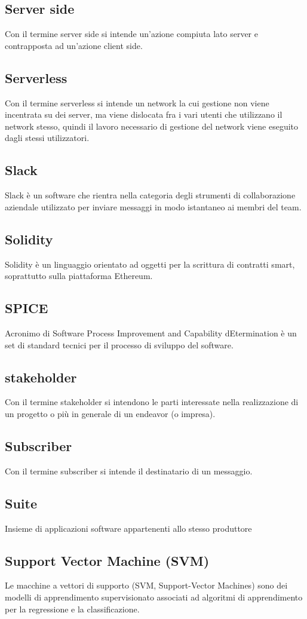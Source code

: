 \subsection{Server side }  Con il termine server side si intende un'azione compiuta lato server e contrapposta ad un'azione client side.
\subsection{Serverless}  Con il termine serverless si intende un network la cui gestione non viene incentrata su dei server, ma viene dislocata fra i vari utenti che utilizzano il network stesso, quindi il lavoro necessario di gestione del network viene eseguito dagli stessi utilizzatori.
\subsection{Slack}  Slack è un software che rientra nella categoria degli strumenti di collaborazione aziendale utilizzato per inviare messaggi in modo istantaneo ai membri del team.
\subsection{Solidity}  Solidity è un linguaggio orientato ad oggetti per la scrittura di contratti smart, soprattutto sulla piattaforma Ethereum.
\subsection{SPICE}  Acronimo di Software Process Improvement and Capability dEtermination è un set di standard tecnici per il processo di sviluppo del software.
\subsection{stakeholder}  Con il termine stakeholder si intendono le parti interessate nella realizzazione di un progetto o più in generale di un endeavor (o impresa).
\subsection{Subscriber}  Con il termine subscriber si intende il destinatario di un messaggio.
\subsection{Suite}  Insieme di applicazioni software appartenenti allo stesso produttore
\subsection{Support Vector Machine (SVM)}  Le macchine a vettori di supporto (SVM, Support-Vector Machines) sono dei modelli di apprendimento supervisionato associati ad algoritmi di apprendimento per la regressione e la classificazione.
